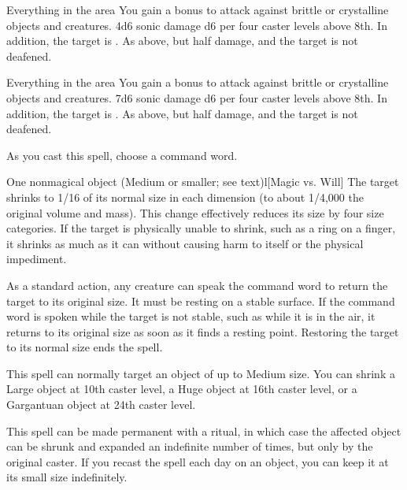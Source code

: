\begin{spelltargets}{Everything in the area}
    \spellspecial You gain a  bonus to attack against brittle or crystalline objects and creatures.
    \spellsuccess 4d6 sonic damage \add d6 per four caster levels above 8th. In addition, the target is \deafened.
    \spellfailure As above, but half damage, and the target is not deafened.
\end{spelltargets}

\begin{spelltargets}{Everything in the area}
    \spellspecial You gain a  bonus to attack against brittle or crystalline objects and creatures.
    \spellsuccess 7d6 sonic damage \add d6 per four caster levels above 8th. In addition, the target is \deafened.
    \spellfailure As above, but half damage, and the target is not deafened.
\end{spelltargets}

\spellrng{\rngclose}
\spellspecial As you cast this spell, choose a command word.
\begin{spelltarget}{One nonmagical object (Medium or smaller; see text)}l[Magic vs. Will]
    \spellsuccess The target shrinks to 1/16 of its normal size in each dimension (to about 1/4,000 the original volume and mass). This change effectively reduces its size by four size categories. If the target is physically unable to shrink, such as a ring on a finger, it shrinks as much as it can without causing harm to itself or the physical impediment.

    As a standard action, any creature can speak the command word to return the target to its original size. It must be resting on a stable surface. If the command word is spoken while the target is not stable, such as while it is in the air, it returns to its original size as soon as it finds a resting point. Restoring the target to its normal size ends the spell.
\end{spelltarget}
\spellnotes This spell can normally target an object of up to Medium size. You can shrink a Large object at 10th caster level, a Huge object at 16th caster level, or a Gargantuan object at 24th caster level.
\par This spell can be made permanent with a  ritual, in which case the affected object can be shrunk and expanded an indefinite number of times, but only by the original caster. If you recast the spell each day on an object, you can keep it at its small size indefinitely.

